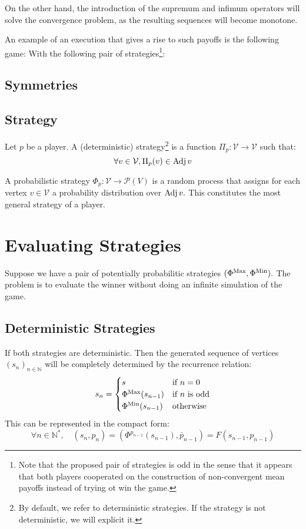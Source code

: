 On the other hand, the introduction of the supremum and infimum operators will solve the convergence problem, as the resulting sequences will become monotone.

An example of an execution that gives a rise to such payoffs is the following game:  
With the following pair of strategies\footnote{Note that the proposed pair of strategies is odd in the sense that it appears that both players cooperated on the construction of non-convergent mean payoffs instead of trying ot win the game.}:
\subsection{Symmetries}

\subsection{Strategy}
Let $p$ be a player. \newline 
A (deterministic) strategy\footnote{By default, we refer to deterministic strategies. If the strategy is not deterministic, we will explicit it.} is a function $\Pi_p:\mathcal{V}\rightarrow \mathcal{V}$ such that:
$$
\forall v\in\mathcal{V}, \Pi_p(v) \in \operatorname{Adj} v
$$

A probabilistic strategy $\Phi_p:\mathcal{V}\rightarrow \mathscr{P}(V)$ is a random process that assigns for each vertex $v\in\mathcal{V}$ a probability distribution over $\operatorname{Adj} v.$ This constitutes the most general strategy of a player.

\section{Evaluating Strategies}
Suppose we have a pair of potentially probabilitic strategies $(\Phi^{\operatorname{Max}},\Phi^{\operatorname{Min}}).$ The problem is to evaluate the winner without doing an infinite simulation of the game. 
\subsection{Deterministic Strategies}
If both strategies are deterministic. Then the generated sequence of vertices $(s_n)_{n\in\mathbb{N}}$ will be completely determined by the recurrence relation:
$$
s_n=\begin{cases}
	s & \text{if } \space n=0 \\
	\Phi^{\operatorname{Max}}(s_{n-1})& \text{if}\ n \ \text{is odd} \\
	\Phi^{\operatorname{Min}} (s_{n-1}) & \text{otherwise}
\end{cases}
$$
This can be represented in the compact form:
$$
\forall n\in\mathbb{N}^*,\quad \left(s_n, p_n
\right) = \left(\Phi^{p_{n-1}}(s_{n-1}), \bar{p}_{n-1}\right) = F(s_{n-1},p_{n-1})
$$


